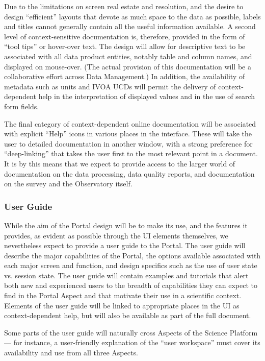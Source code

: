 Due to the limitations on screen real estate and resolution, and the desire to design ``efficient'' layouts that devote as much space to the data as possible, labels and titles cannot generally contain all the useful information available.
A second level of context-sensitive documentation is, therefore, provided in the form of ``tool tips'' or hover-over text.
The design will allow for descriptive text to be associated with all data product entities, notably table and column names, and displayed on mouse-over.
(The actual provision of this documentation will be a collaborative effort across Data Management.)
In addition, the availability of metadata such as units and IVOA UCDs will permit the delivery of context-dependent help in the interpretation of displayed values and in the use of search form fields.

The final category of context-dependent online documentation will be associated with explicit ``Help'' icons in various places in the interface.
These will take the user to detailed documentation in another window, with a strong preference for ``deep-linking'' that takes the user first to the most relevant point in a document.
It is by this means that we expect to provide access to the larger world of documentation on the data processing, data quality reports, and documentation on the survey and the Observatory itself.

\subsubsection{User Guide}\label{user-guide}

While the aim of the Portal design will be to make its use, and the features it provides, as evident as possible through the UI elements themselves, we nevertheless expect to provide a user guide to the Portal.
The user guide will describe the major capabilities of the Portal, the options available associated with each major screen and function, and design specifics such as the use of user state vs. session state.
The user guide will contain examples and tutorials that alert both new and experienced users to the breadth of capabilities they can expect to find in the Portal Aspect and that motivate their use in a scientific context.
Elements of the user guide will be linked to appropriate places in the UI as context-dependent help, but will also be available as part of the full document.

Some parts of the user guide will naturally cross Aspects of the Science Platform --- for instance, a user-friendly explanation of the ``user workspace'' must cover its availability and use from all three Aspects.

